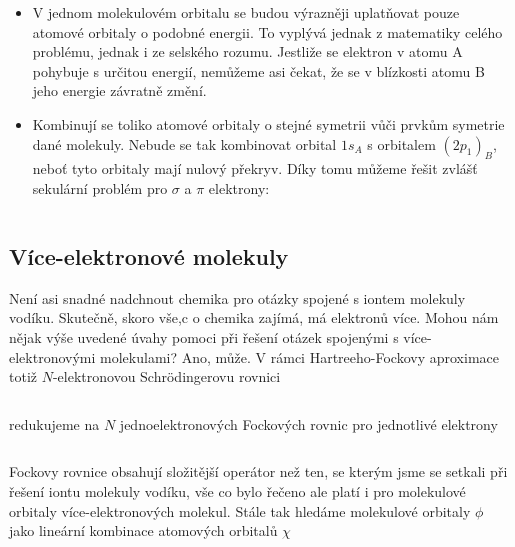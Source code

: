 \begin{itemize}
\item V jednom molekulovém orbitalu se budou výrazněji uplatňovat pouze atomové orbitaly o podobné energii. To vyplývá jednak z matematiky celého problému, jednak i ze selského rozumu. Jestliže se elektron v atomu A pohybuje s určitou energií, nemůžeme asi čekat, že se v blízkosti atomu B jeho energie závratně změní.

\item Kombinují se toliko atomové orbitaly o stejné symetrii vůči prvkům symetrie dané molekuly. Nebude se tak kombinovat orbital $1s_A$ s orbitalem $(2p_1)_B$, neboť tyto orbitaly mají nulový překryv. Díky tomu můžeme řešit zvlášť sekulární problém pro $\sigma$ a $\pi$ elektrony:

\begin{equation}
\label{rov:XXX}
\end{equation}

\end{itemize}


\subsection{Více-elektronové molekuly}
Není asi snadné nadchnout chemika pro otázky spojené s iontem molekuly vodíku. Skutečně, skoro vše,c o chemika zajímá, má elektronů více. Mohou nám nějak výše uvedené úvahy pomoci při řešení otázek spojenými s více-elektronovými molekulami? Ano, může. V rámci Hartreeho-Fockovy aproximace totiž $N$-elektronovou Schr\"odingerovu rovnici 

\begin{equation}
\label{rov:XXX}
\end{equation}

\noindent redukujeme na $N$ jednoelektronových Fockových rovnic pro jednotlivé elektrony

\begin{equation}
\label{rov:XXX}
\end{equation}

\noindent Fockovy rovnice obsahují složitější operátor než ten, se kterým jsme se setkali při řešení iontu molekuly vodíku, vše co bylo řečeno ale platí i pro molekulové orbitaly více-elektronových molekul. Stále tak hledáme molekulové orbitaly $\phi$ jako lineární kombinace atomových orbitalů $\chi$

\begin{equation}
\label{rov:XXX}
\end{equation}

